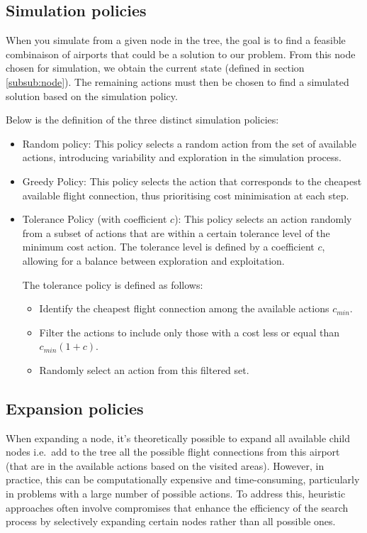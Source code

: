 \subsection{Simulation policies}
When you simulate from a given node in the tree, the goal is to find a feasible combinaison of airports that could be a solution to our problem.
From this node chosen for simulation, we obtain the current state (defined in section \ref{subsub:node}). The remaining actions must then be chosen to find a simulated solution based on the simulation policy.

Below is the definition of the three distinct simulation policies:

\begin{itemize}
    \item Random policy: This policy selects a random action from the set of available actions, introducing variability and exploration in the simulation process.
    \item Greedy Policy: This policy selects the action that corresponds to the cheapest available flight connection, thus prioritising cost minimisation at each step.

    \item Tolerance Policy (with coefficient $c$):
          This policy selects an action randomly from a subset of actions that are within a certain tolerance level of the minimum cost action. The tolerance level is defined by a coefficient $c$, allowing for a balance between exploration and exploitation.

          The tolerance policy is defined as follows:
          \begin{itemize}
              \item Identify the cheapest flight connection among the available actions $c_{min}$.
              \item Filter the actions to include only those with a cost less or equal than $c_{min}(1+c) $.
              \item Randomly select an action from this filtered set.
          \end{itemize}

\end{itemize}

\subsection{Expansion policies}
When expanding a node, it’s theoretically possible to expand all available child nodes i.e.\ add to the tree all the possible flight connections from this airport (that are in the available actions based on the visited areas). However, in practice, this can be computationally expensive and time-consuming, particularly in problems with a large number of possible actions. To address this, heuristic approaches often involve compromises that enhance the efficiency of the search process by selectively expanding certain nodes rather than all possible ones.

